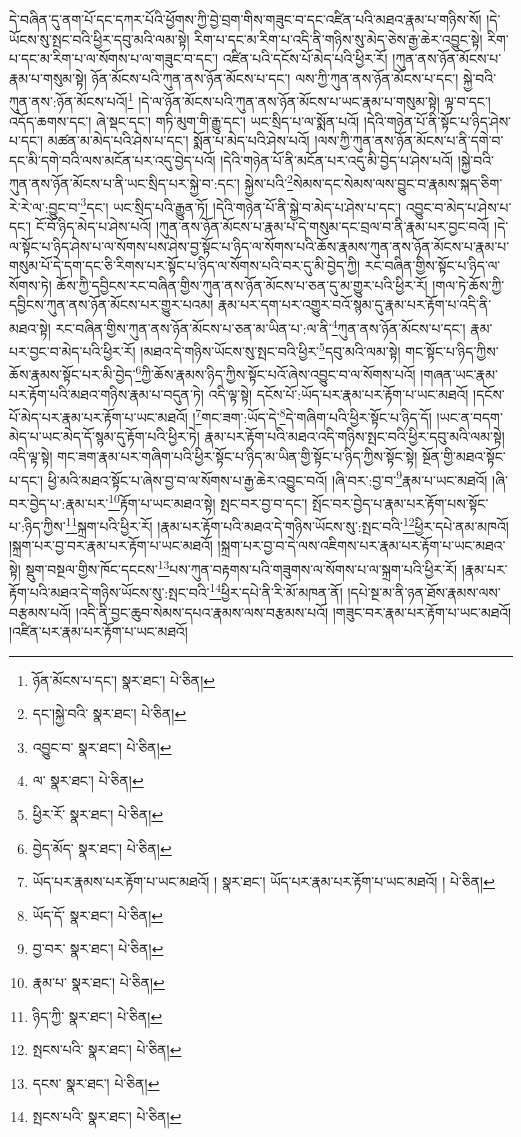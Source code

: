 དེ་བཞིན་དུ་ནག་པོ་དང་དཀར་པོའི་ཕྱོགས་ཀྱི་བྱེ་བྲག་གིས་གཟུང་བ་དང་འཛིན་པའི་མཐའ་རྣམ་པ་གཉིས་སོ། །དེ་ཡོངས་སུ་སྤང་བའི་ཕྱིར་དབུ་མའི་ལམ་སྟེ། རིག་པ་དང་མ་རིག་པ་འདི་ནི་གཉིས་སུ་མེད་ཅེས་རྒྱ་ཆེར་འབྱུང་སྟེ། རིག་པ་དང་མ་རིག་པ་ལ་སོགས་པ་ལ་གཟུང་བ་དང་། འཛིན་པའི་དངོས་པོ་མེད་པའི་ཕྱིར་རོ། །ཀུན་ནས་ཉོན་མོངས་པ་རྣམ་པ་གསུམ་སྟེ། ཉོན་མོངས་པའི་ཀུན་ནས་ཉོན་མོངས་པ་དང་། ལས་ཀྱི་ཀུན་ནས་ཉོན་མོངས་པ་དང་། སྐྱེ་བའི་ཀུན་ནས་:ཉོན་མོངས་པའོ།\footnote{ཉོན་མོངས་པ་དང་།  སྣར་ཐང་།  པེ་ཅིན། } །དེ་ལ་ཉོན་མོངས་པའི་ཀུན་ནས་ཉོན་མོངས་པ་ཡང་རྣམ་པ་གསུམ་སྟེ། ལྟ་བ་དང་། འདོད་ཆགས་དང་། ཞེ་སྡང་དང་། གཏི་མུག་གི་རྒྱུ་དང་། ཡང་སྲིད་པ་ལ་སྨོན་པའོ། །དེའི་གཉེན་པོ་ནི་སྟོང་པ་ཉིད་ཤེས་པ་དང་། མཚན་མ་མེད་པའི་ཤེས་པ་དང་། སྨོན་པ་མེད་པའི་ཤེས་པའོ། །ལས་ཀྱི་ཀུན་ནས་ཉོན་མོངས་པ་ནི་དགེ་བ་དང་མི་དགེ་བའི་ལས་མངོན་པར་འདུ་བྱེད་པའོ། །དེའི་གཉེན་པོ་ནི་མངོན་པར་འདུ་མི་བྱེད་པ་ཤེས་པའོ། །སྐྱེ་བའི་ཀུན་ནས་ཉོན་མོངས་པ་ནི་ཡང་སྲིད་པར་སྐྱེ་བ་:དང་། སྐྱེས་པའི་\footnote{དང་།སྐྱེ་བའི་  སྣར་ཐང་།  པེ་ཅིན། }སེམས་དང་སེམས་ལས་བྱུང་བ་རྣམས་སྐད་ཅིག་རེ་རེ་ལ་:བྱུང་བ་\footnote{འབྱུང་བ་  སྣར་ཐང་།  པེ་ཅིན། }དང་། ཡང་སྲིད་པའི་རྒྱུན་ཏོ། །དེའི་གཉེན་པོ་ནི་སྐྱེ་བ་མེད་པ་ཤེས་པ་དང་། འབྱུང་བ་མེད་པ་ཤེས་པ་དང་། ངོ་བོ་ཉིད་མེད་པ་ཤེས་པའོ། །ཀུན་ནས་ཉོན་མོངས་པ་རྣམ་པ་དེ་གསུམ་དང་བྲལ་བ་ནི་རྣམ་པར་བྱང་བའོ། །དེ་ལ་སྟོང་པ་ཉིད་ཤེས་པ་ལ་སོགས་པས་ཤེས་བྱ་སྟོང་པ་ཉིད་ལ་སོགས་པའི་ཆོས་རྣམས་ཀུན་ནས་ཉོན་མོངས་པ་རྣམ་པ་གསུམ་པོ་དེ་དག་དང་ཅི་རིགས་པར་སྟོང་པ་ཉིད་ལ་སོགས་པའི་བར་དུ་མི་བྱེད་ཀྱི། རང་བཞིན་གྱིས་སྟོང་པ་ཉིད་ལ་སོགས་ཏེ། ཆོས་ཀྱི་དབྱིངས་རང་བཞིན་གྱིས་ཀུན་ནས་ཉོན་མོངས་པ་ཅན་དུ་མ་གྱུར་པའི་ཕྱིར་རོ། །གལ་ཏེ་ཆོས་ཀྱི་དབྱིངས་ཀུན་ནས་ཉོན་མོངས་པར་གྱུར་པའམ། རྣམ་པར་དག་པར་འགྱུར་བའོ་སྙམ་དུ་རྣམ་པར་རྟོག་པ་འདི་ནི་མཐའ་སྟེ། རང་བཞིན་གྱིས་ཀུན་ནས་ཉོན་མོངས་པ་ཅན་མ་ཡིན་པ་:ལ་ནི་\footnote{ལ་  སྣར་ཐང་།  པེ་ཅིན། }ཀུན་ནས་ཉོན་མོངས་པ་དང་། རྣམ་པར་བྱང་བ་མེད་པའི་ཕྱིར་རོ། །མཐའ་དེ་གཉིས་ཡོངས་སུ་སྤང་བའི་ཕྱིར་\footnote{ཕྱིར་རོ་  སྣར་ཐང་།  པེ་ཅིན། }དབུ་མའི་ལམ་སྟེ། གང་སྟོང་པ་ཉིད་ཀྱིས་ཆོས་རྣམས་སྟོང་པར་མི་བྱེད་\footnote{བྱེད་མོད་  སྣར་ཐང་།  པེ་ཅིན། }ཀྱི་ཆོས་རྣམས་ཉིད་ཀྱིས་སྟོང་པའོ་ཞེས་འབྱུང་བ་ལ་སོགས་པའོ། །གཞན་ཡང་རྣམ་པར་རྟོག་པའི་མཐའ་གཉིས་རྣམ་པ་བདུན་ཏེ། འདི་ལྟ་སྟེ། དངོས་པོ་:ཡོད་པར་རྣམ་པར་རྟོག་པ་ཡང་མཐའོ། །དངོས་པོ་མེད་པར་རྣམ་པར་རྟོག་པ་ཡང་མཐའོ། །\footnote{ཡོད་པར་རྣམས་པར་རྟོག་པ་ཡང་མཐའོ། །  སྣར་ཐང་། ཡོད་པར་རྣམ་པར་རྟོག་པ་ཡང་མཐའོ། །  པེ་ཅིན། }གང་ཟག་:ཡོད་དེ་\footnote{ཡོད་དོ་  སྣར་ཐང་།  པེ་ཅིན། }དེ་གཞིག་པའི་ཕྱིར་སྟོང་པ་ཉིད་དོ། །ཡང་ན་བདག་མེད་པ་ཡང་མེད་དོ་སྙམ་དུ་རྟོག་པའི་ཕྱིར་ཏེ། རྣམ་པར་རྟོག་པའི་མཐའ་འདི་གཉིས་སྤང་བའི་ཕྱིར་དབུ་མའི་ལམ་སྟེ། འདི་ལྟ་སྟེ། གང་ཟག་རྣམ་པར་གཞིག་པའི་ཕྱིར་སྟོང་པ་ཉིད་མ་ཡིན་གྱི་སྟོང་པ་ཉིད་ཀྱིས་སྟོང་སྟེ། སྔོན་གྱི་མཐའ་སྟོང་པ་དང་། ཕྱི་མའི་མཐའ་སྟོང་པ་ཞེས་བྱ་བ་ལ་སོགས་པ་རྒྱ་ཆེར་འབྱུང་བའོ། །ཞི་བར་:བྱ་བ་\footnote{བྱ་བར་  སྣར་ཐང་།  པེ་ཅིན། }རྣམ་པ་ཡང་མཐའོ། །ཞི་བར་བྱེད་པ་:རྣམ་པར་\footnote{རྣམ་པ་  སྣར་ཐང་།  པེ་ཅིན། }རྟོག་པ་ཡང་མཐའ་སྟེ། སྤང་བར་བྱ་བ་དང་། སྤོང་བར་བྱེད་པ་རྣམ་པར་རྟོག་པས་སྟོང་པ་:ཉིད་ཀྱིས་\footnote{ཉིད་ཀྱི་  སྣར་ཐང་།  པེ་ཅིན། }སྐྲག་པའི་ཕྱིར་རོ། །རྣམ་པར་རྟོག་པའི་མཐའ་དེ་གཉིས་ཡོངས་སུ་:སྤང་བའི་\footnote{སྤངས་པའི་  སྣར་ཐང་།  པེ་ཅིན། }ཕྱིར་དཔེ་ནམ་མཁའོ། །སྐྲག་པར་བྱ་བར་རྣམ་པར་རྟོག་པ་ཡང་མཐའོ། །སྐྲག་པར་བྱ་བ་དེ་ལས་འཇིགས་པར་རྣམ་པར་རྟོག་པ་ཡང་མཐའ་སྟེ། སྡུག་བསྔལ་གྱིས་ཁོང་དངངས་\footnote{དངས་  སྣར་ཐང་།  པེ་ཅིན། }པས་ཀུན་བརྟགས་པའི་གཟུགས་ལ་སོགས་པ་ལ་སྐྲག་པའི་ཕྱིར་རོ། །རྣམ་པར་རྟོག་པའི་མཐའ་དེ་གཉིས་ཡོངས་སུ་:སྤང་བའི་\footnote{སྤངས་པའི་  སྣར་ཐང་།  པེ་ཅིན། }ཕྱིར་དཔེ་ནི་རི་མོ་མཁན་ནོ། །དཔེ་སྔ་མ་ནི་ཉན་ཐོས་རྣམས་ལས་བརྩམས་པའོ། །འདི་ནི་བྱང་ཆུབ་སེམས་དཔའ་རྣམས་ལས་བརྩམས་པའོ། །གཟུང་བར་རྣམ་པར་རྟོག་པ་ཡང་མཐའོ། །འཛིན་པར་རྣམ་པར་རྟོག་པ་ཡང་མཐའོ། 